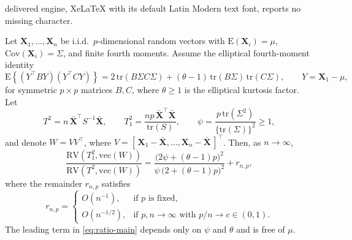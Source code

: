 \documentclass[10pt,a4paper]{amsart}
\begin{document}
delivered engine, XeLaTeX with its default Latin Modern text font, reports no missing character.
\begin{proposition} 
	\label{thm:ratio}
	Let $\mathbf{X}_{1},\ldots,\mathbf{X}_{n}$ be i.i.d.\ $p$-dimensional random vectors with 
	$\mathrm{E}(\mathbf{X}_{i})=\mu$, $\mathrm{Cov}(\mathbf{X}_{i})=\Sigma$, and finite fourth moments. 
	Assume the elliptical fourth-moment identity
	\begin{equation}
		\mathrm{E}\!\left\{ (Y^\top B Y)(Y^\top C Y) \right\}
		= 2\,\mathrm{tr}(B\Sigma C\Sigma) + (\theta-1)\,\mathrm{tr}(B\Sigma)\,\mathrm{tr}(C\Sigma),
		\qquad Y=\mathbf{X}_1-\mu,
		\label{eq:elliptical-identity}
	\end{equation}
	for symmetric $p\times p$ matrices $B,C$, where $\theta\ge 1$ is the elliptical kurtosis factor. 
	Let
	\[
	T^{2}=n\,\bar{\mathbf{X}}^{\top} S^{-1}\bar{\mathbf{X}}, 
	\qquad 
	T_{1}^{2}=\frac{n p\,\bar{\mathbf{X}}^{\top}\bar{\mathbf{X}}}{\mathrm{tr}(S)},
	\qquad
	\psi=\frac{p\,\mathrm{tr}(\Sigma^2)}{\{\mathrm{tr}(\Sigma)\}^{2}}\ge 1,
	\]
	and denote $W=VV^\top$, where $V=[\,\mathbf{X}_{1}-\bar{\mathbf{X}},\ldots,\mathbf{X}_{n}-\bar{\mathbf{X}}\,]^{\top}$. 
	Then, as $n\to\infty$,
	\begin{equation}
		\frac{\mathrm{RV}(T_1^2,\mathrm{vec}(W))}{\mathrm{RV}(T^2,\mathrm{vec}(W))}
		=\frac{\big(2\psi+(\theta-1)p\big)^2}{\psi\,\big(2+(\theta-1)p\big)^2} + r_{n,p},
		\label{eq:ratio-main}
	\end{equation}
	where the remainder $r_{n,p}$ satisfies
	\[
	r_{n,p}=
	\begin{cases}
		O(n^{-1}), & \text{if $p$ is fixed}, \\[0.5ex]
		O(n^{-1/2}), & \text{if $p,n\to\infty$ with $p/n\to c\in(0,1)$}.
	\end{cases}
	\]
	The leading term in \eqref{eq:ratio-main} depends only on $\psi$ and $\theta$ and is free of $\mu$.
\end{proposition}
\end{document}
